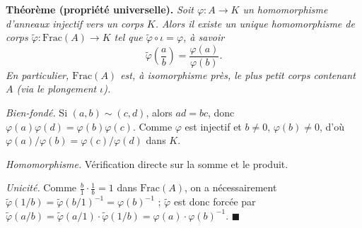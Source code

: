 \decsep{}


\begin{tcolorbox}[thmbox]
  \textbf{Théorème (propriété universelle).}\enspace%
  \textit{Soit $\varphi : A \to K$ un homomorphisme d'anneaux injectif vers
  un corps $K$. Alors il existe un unique homomorphisme de corps
  $\tilde{\varphi} : \mathrm{Frac}(A) \to K$ tel que $\tilde{\varphi}\circ\iota = \varphi$,
  à savoir}
  \[
    \tilde{\varphi}\!\left(\frac{a}{b}\right) = \frac{\varphi(a)}{\varphi(b)}.
  \]
  \textit{En particulier, $\mathrm{Frac}(A)$ est, à isomorphisme près, le plus
  petit corps contenant $A$ (via le plongement $\iota$).}
\end{tcolorbox}

\begin{mdframed}[style=proofbar]
  \textit{Bien-fondé.} Si $(a,b)\sim(c,d)$, alors $ad=bc$, donc
  $\varphi(a)\varphi(d)=\varphi(b)\varphi(c)$.
  Comme $\varphi$ est injectif et $b\neq 0$, $\varphi(b)\neq 0$, d'où
  $\varphi(a)/\varphi(b) = \varphi(c)/\varphi(d)$ dans $K$.

  \textit{Homomorphisme.} Vérification directe sur la somme et le produit.

  \textit{Unicité.} Comme $\tfrac{b}{1}\cdot\tfrac{1}{b}=1$ dans
  $\mathrm{Frac}(A)$, on a nécessairement
  $\tilde\varphi(1/b)={\tilde\varphi(b/1)}^{-1}={\varphi(b)}^{-1}$ ;
  $\tilde\varphi$ est donc forcée par $\tilde\varphi(a/b)
  = \tilde\varphi(a/1)\cdot\tilde\varphi(1/b)
  = \varphi(a)\cdot{\varphi(b)}^{-1}$. $\blacksquare$
\end{mdframed}

\decsep{}


